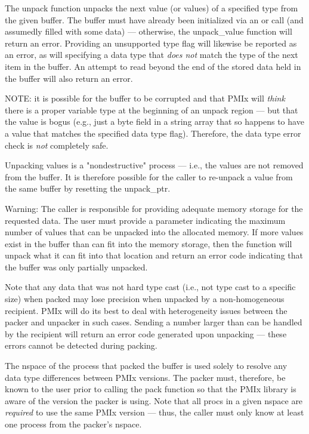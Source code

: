 \descr

The unpack function unpacks the next value (or values) of a specified type from the given buffer. The buffer must have already been initialized via an  or  call (and assumedly filled with some data) --- otherwise, the unpack_value function will return an error. Providing an unsupported type flag will likewise be reported as an error, as will specifying a data type that \textit{does not} match the type of the next item in the buffer. An attempt to read beyond the end of the stored data held in the buffer will also return an error.

NOTE: it is possible for the buffer to be corrupted and that \ac{PMIx} will \textit{think} there is a proper variable type at the beginning of an unpack region --- but that the value is bogus (e.g., just a byte field in a string array that so happens to have a value that matches the specified data type flag). Therefore, the data type error check is \textit{not} completely safe.

Unpacking values is a "nondestructive" process --- i.e., the values are not removed from the buffer. It is therefore possible for the caller to re-unpack a value from the same buffer by resetting the unpack_ptr.

Warning: The caller is responsible for providing adequate memory storage for the requested data. The user must provide a parameter indicating the maximum number of values that can be unpacked into the allocated memory. If more values exist in the buffer than can fit into the memory storage, then the function will unpack what it can fit into that location and return an error code indicating that the buffer was only partially unpacked.

Note that any data that was not hard type cast (i.e., not type cast to a specific size) when packed may lose precision when unpacked by a non-homogeneous recipient. \ac{PMIx} will do its best to deal with heterogeneity issues between the packer and unpacker in such cases. Sending a number larger than can be handled by the recipient will return an error code generated upon unpacking --- these errors cannot be detected during packing.

The nspace of the process that packed the buffer is used solely to resolve any data type
differences between \ac{PMIx} versions. The packer must, therefore, be
known to the user prior to calling the pack function so that the
\ac{PMIx} library is aware of the version the packer is using. Note that
all procs in a given nspace are \textit{required} to use the same \ac{PMIx}
version --- thus, the caller must only know at least one process from the
packer's nspace.


